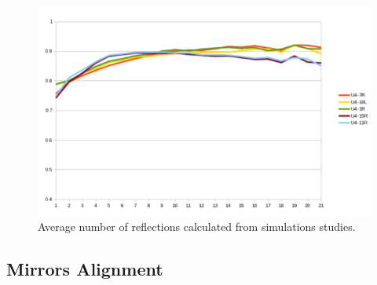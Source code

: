 \begin{figure}[h]
\centering
	\includegraphics[width=1.0\columnwidth,keepaspectratio]{img/mirrorsReflectivityAfter.png}
	\caption{Average number of reflections calculated from simulations studies.}
	\label{fig:reflectivityAfter}
\end{figure}




\subsection{Mirrors Alignment}



